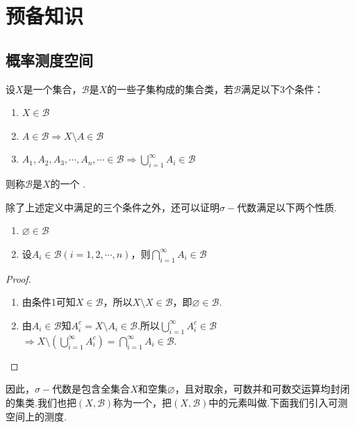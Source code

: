 ﻿\chapter{预备知识}

\section{概率测度空间}

\begin{definition}[$\sigma-\!\!$代数]
    设$X$是一个集合，$\mathcal{B}$是$X$的一些子集构成的集合类，若$\mathcal{B}$满足以下3个条件：
    \begin{enumerate}
        \item $X\in\mathcal{B}$
        \item $A\in\mathcal{B}\Rightarrow X\setminus A\in\mathcal{B}$
        \item $A_1,A_2,A_3,\cdots,A_n,\cdots\in\mathcal{B}\Rightarrow\bigcup_{i=1}^{\infty}{A_i\in\mathcal{B}}$
    \end{enumerate}
    则称$\mathcal{B}$是$X$的一个 .
\end{definition}

除了上述定义中满足的三个条件之外，还可以证明$\sigma-\text{代数}$满足以下两个性质.

\begin{property}
    \begin{enumerate}
        \item $\varnothing\in\mathcal{B}$
        \item 设$A_i\in\mathcal{B}(i=1,2,\cdots,n)$，则$\bigcap_{i=1}^{\infty}{A_i}\in\mathcal{B}$   
    \end{enumerate}
\end{property}
\begin{proof}
    \begin{enumerate}
        \item 由条件1可知$X\in\mathcal{B}$，所以$X\setminus X\in\mathcal{B}$，即$\varnothing\in\mathcal{B}$.
        \item 由$A_i\in\mathcal{B}$知$A_i^c=X\setminus A_i \in\mathcal{B}$.所以$\bigcup_{i=1}^\infty{A_i^c}\in\mathcal{B}$
        $\Rightarrow X\setminus\left(\bigcup_{i=1}^\infty{A_i^c}\right)=\bigcap_{i=1}^\infty{A_i}\in\mathcal{B}$.\qedhere
    \end{enumerate}
\end{proof}

因此，$\sigma-$代数是包含全集合$X$和空集$\varnothing$，且对取余，可数并和可数交运算均封闭的集类.我们也把$(X,\mathcal{B})$称为一个，把$(X,\mathcal{B})$中的元素叫做.下面我们引入可测空间上的测度.

